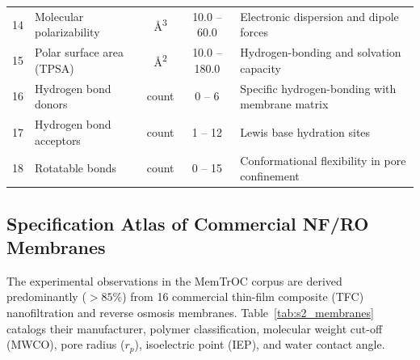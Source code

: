 \documentclass[11pt]{article}
\begin{document}
\begin{table}[H]
\begin{tabularx}{\textwidth}{c l c c >{\raggedright\arraybackslash}X}
14 & Molecular polarizability    & \si{\angstrom\cubed} & 10.0 -- 60.0 & Electronic dispersion and dipole forces \\
15 & Polar surface area (TPSA)   & \si{\angstrom\squared} & 10.0 -- 180.0 & Hydrogen-bonding and solvation capacity \\
16 & Hydrogen bond donors        & count & 0 -- 6 & Specific hydrogen-bonding with membrane matrix \\
17 & Hydrogen bond acceptors     & count & 1 -- 12 & Lewis base hydration sites \\
18 & Rotatable bonds             & count & 0 -- 15 & Conformational flexibility in pore confinement \\
\bottomrule
\end{tabularx}
\end{table}

\newpage

\subsection{Specification Atlas of Commercial NF/RO Membranes}
\label{sec:membrane_atlas}
The experimental observations in the MemTrOC corpus are derived predominantly ($>85\%$) from 16 commercial thin-film composite (TFC) nanofiltration and reverse osmosis membranes. Table~\ref{tab:s2_membranes} catalogs their manufacturer, polymer classification, molecular weight cut-off (MWCO), pore radius ($r_p$), isoelectric point (IEP), and water contact angle.
\end{document}
